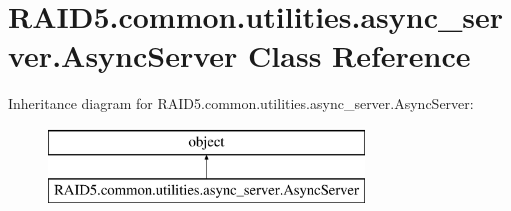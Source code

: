 \hypertarget{class_r_a_i_d5_1_1common_1_1utilities_1_1async__server_1_1_async_server}{}\section{R\+A\+I\+D5.\+common.\+utilities.\+async\+\_\+server.\+Async\+Server Class Reference}
\label{class_r_a_i_d5_1_1common_1_1utilities_1_1async__server_1_1_async_server}
Inheritance diagram for R\+A\+I\+D5.\+common.\+utilities.\+async\+\_\+server.\+Async\+Server\+:\begin{figure}[H]
\begin{center}
\leavevmode
\includegraphics[height=2.000000cm]{class_r_a_i_d5_1_1common_1_1utilities_1_1async__server_1_1_async_server}
\end{center}
\end{figure}
